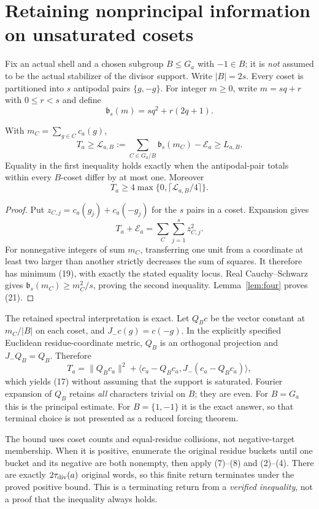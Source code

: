 \section{Retaining nonprincipal information on unsaturated cosets}
Fix an actual shell and a chosen subgroup $B\le G_a$ with $-1\in B$; it is
\emph{not} assumed to be the actual stabilizer of the divisor support. Write
$|B|=2s$. Every coset is partitioned into $s$ antipodal pairs $\{g,-g\}$.
For integer $m\ge0$, write $m=sq+r$ with $0\le r<s$ and define
\[
 \mathfrak b_s(m)=sq^2+r(2q+1).                            \tag{19}
\]
\begin{theorem}\label{thm:integer}
With $m_C=\sum_{g\in C}c_a(g)$,
\[
 \boxed{T_a\ge\mathcal L_{a,B}:=
 \sum_{C\in G_a/B}\mathfrak b_s(m_C)-\mathcal E_a
 \ge L_{a,B}.}                                           \tag{20}
\]
Equality in the first inequality holds exactly when the antipodal-pair totals
within every $B$-coset differ by at most one. Moreover
\[
 \boxed{T_a\ge4\max\{0,\lceil\mathcal L_{a,B}/4\rceil\}.} \tag{21}
\]
\end{theorem}
\begin{proof}
Put $z_{C,j}=c_a(g_j)+c_a(-g_j)$ for the $s$ pairs in a coset. Expansion gives
\[
 T_a+\mathcal E_a=\sum_C\sum_{j=1}^s z_{C,j}^2.
\]
For nonnegative integers of sum $m_C$, transferring one unit from a coordinate
at least two larger than another strictly decreases the sum of squares.
It therefore has minimum (19), with exactly the stated equality locus.
Real Cauchy--Schwarz gives $\mathfrak b_s(m_C)\ge m_C^2/s$, proving the second
inequality. Lemma~\ref{lem:four} proves (21).
\end{proof}

The retained spectral interpretation is exact. Let $Q_Bc$ be the vector constant
at $m_C/|B|$ on each coset, and $J_-c(g)=c(-g)$. In the explicitly specified
Euclidean residue-coordinate metric, $Q_B$ is an orthogonal projection and
$J_-Q_B=Q_B$. Therefore
\[
 T_a=\|Q_Bc_a\|^2+
 \langle c_a-Q_Bc_a,J_-(c_a-Q_Bc_a)\rangle,
\]
which yields (17) without assuming that the support is saturated. Fourier
expansion of $Q_B$ retains \emph{all} characters trivial on $B$; they are even.
For $B=G_a$ this is the principal estimate. For $B=\{1,-1\}$ it is the exact
answer, so that terminal choice is not presented as a reduced forcing theorem.

The bound uses coset counts and equal-residue collisions, not negative-target
membership. When it is positive, enumerate the original residue buckets until
one bucket and its negative are both nonempty, then apply (7)--(8) and (2)--(4).
There are exactly $2\tau_{\rm div}(a)$ original words, so this finite return
terminates under the proved positive bound. This is a terminating return from a
\emph{verified inequality}, not a proof that the inequality always holds.

